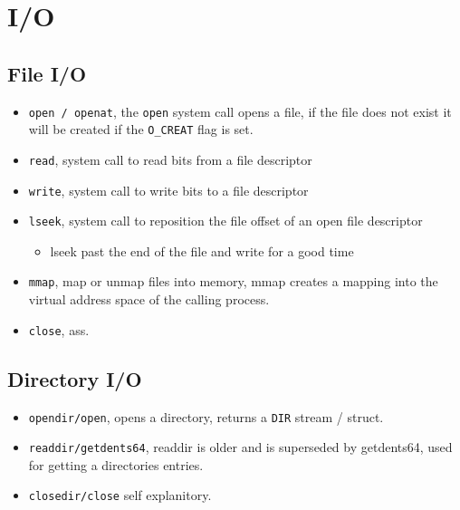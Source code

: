 \section{I/O}

\subsection{File I/O}
\begin{itemize}
\item \texttt{open / openat}, the \texttt{open} system call opens a file, if the
    file does not exist it will be created if the \texttt{O\_CREAT} flag is set.
\item \texttt{read}, system call to read bits from a file descriptor
\item \texttt{write}, system call to write bits to a file descriptor
\item \texttt{lseek}, system call to reposition the file offset of an open file descriptor
  \begin{itemize}
  \item lseek past the end of the file and write for a good time
  \end{itemize}
\item \texttt{mmap}, map or unmap files into memory, mmap creates a mapping into
  the virtual address space of the calling process.
\item \texttt{close}, ass.
\end{itemize}

\subsection{Directory I/O}
\begin{itemize}
\item \texttt{opendir/open}, opens a directory, returns a \texttt{DIR} stream / struct.
\item \texttt{readdir/getdents64}, readdir is older and is superseded by
  getdents64, used for getting a directories entries.
\item \texttt{closedir/close} self explanitory.
\end{itemize}


